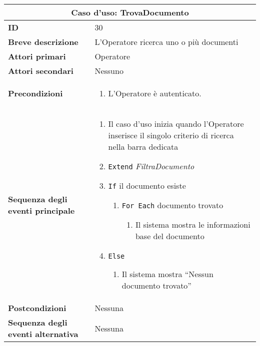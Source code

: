 \documentclass[a4paper]{report}
\begin{document}
\clearpage
\begin{table}[H]
\vspace*{-0cm}
\renewcommand{\arraystretch}{1.9}
\begin{tabular}{|p{3.9cm}|p{9.9cm}|}
\hline
\multicolumn{2}{|c|}{\textbf{Caso d’uso: TrovaDocumento}} \\ \hline
	\textbf{ID} & 30 \\ \hline
	\textbf{Breve descrizione} & L’Operatore ricerca uno o più documenti \\ \hline
	\textbf{Attori primari} & Operatore \\ \hline
	\textbf{Attori secondari} & Nessuno \\ \hline
	\textbf{Precondizioni} & \begin{enumerate}[leftmargin=14pt,label=\arabic*.,labelsep=0.5em,topsep=0pt,partopsep=0pt,parsep=0pt,itemsep=0pt]
        \item L’Operatore è autenticato.
    \end{enumerate} \\ \hline
	\textbf{Sequenza degli eventi principale} & 
\begin{enumerate}[leftmargin=14pt,label=\arabic*.,labelsep=0.5em,topsep=0pt,partopsep=0pt,parsep=0pt,itemsep=0pt]
    \item Il caso d’uso inizia quando l’Operatore inserisce il singolo criterio di ricerca nella barra dedicata 
    \item \texttt{Extend} \textit{FiltraDocumento}
    \item \texttt{If} il documento esiste
    \begin{enumerate}[label=\arabic{enumi}.\arabic*.,leftmargin=22pt,labelsep=0.5em,topsep=0pt,partopsep=0pt,parsep=0pt,itemsep=0pt]
        \item \texttt{For Each} documento trovato
        \begin{enumerate}[label=\arabic{enumi}.\arabic{enumii}.\arabic*.,leftmargin=22pt,labelsep=0.5em,topsep=0pt,partopsep=0pt,parsep=0pt,itemsep=0pt]
            \item Il sistema mostra le informazioni base del documento 
        \end{enumerate}
    \end{enumerate}
    \item \texttt{Else}
    \begin{enumerate}[label=\arabic{enumi}.\arabic*.,leftmargin=22pt,labelsep=0.5em,topsep=0pt,partopsep=0pt,parsep=0pt,itemsep=0pt]
        \item Il sistema mostra “Nessun documento trovato”
    \end{enumerate}
\end{enumerate}\\ \hline
	\textbf{Postcondizioni} & Nessuna \\ \hline
	\textbf{Sequenza degli eventi alternativa} & Nessuna \\ \hline
\end{tabular}
\end{table}
\end{document}
